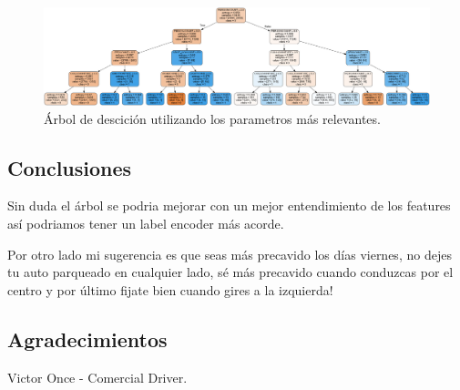 \documentclass[12pt]{article}
\begin{document}
  \begin{figure}[htbp]
    \centering
      \includegraphics[width=1.5\textwidth, height=0.63\textwidth, angle=90]{../images/tree1.png}
    \caption{Árbol de descición utilizando los parametros más relevantes.}
    \label{fig:tree}
  \end{figure}

  \subsection*{Conclusiones}

  Sin duda el árbol se podria mejorar con un mejor entendimiento de los features así podriamos tener un label encoder más acorde. 

  Por otro lado mi sugerencia es que seas más precavido los días viernes, no dejes tu auto parqueado en cualquier lado, sé más precavido cuando conduzcas por el centro y por último fijate bien cuando gires a la izquierda!

  \subsection*{Agradecimientos}
  Victor Once - Comercial Driver. 
\end{document}
